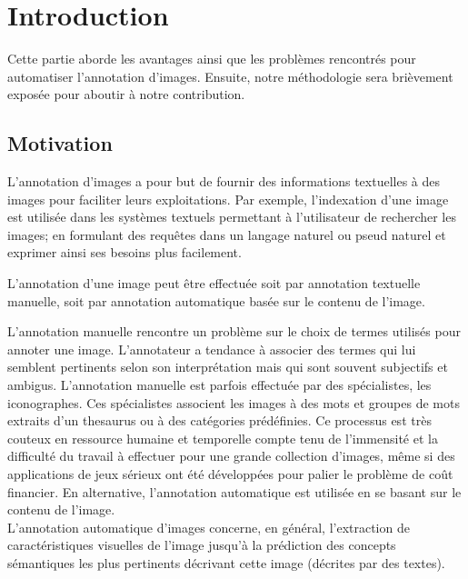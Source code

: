 \chapter{Introduction}
Cette partie aborde les avantages ainsi que les problèmes rencontrés pour automatiser l'annotation d'images. Ensuite, notre méthodologie sera brièvement exposée pour aboutir à notre contribution.

\medskip
\section{Motivation}
\medskip

L’annotation d'images a pour but de fournir des informations textuelles à des images pour faciliter leurs exploitations. Par exemple, l'indexation d'une image est utilisée dans les systèmes textuels permettant à l'utilisateur de rechercher les images; en formulant des requêtes dans un langage naturel ou pseud naturel et exprimer ainsi ses besoins plus facilement.

L'annotation d'une image peut être effectuée soit par annotation textuelle manuelle, soit par annotation automatique basée sur le contenu de l'image.


L'annotation manuelle rencontre un problème sur le choix de termes utilisés pour annoter une image. L'annotateur a tendance à associer des termes qui lui semblent pertinents selon son interprétation mais qui sont souvent subjectifs et ambigus.
L'annotation manuelle est parfois effectuée par des spécialistes, les iconographes. Ces spécialistes associent les images à des mots et groupes de mots extraits d'un thesaurus ou à des catégories prédéfinies. Ce processus est très couteux en ressource humaine et temporelle compte tenu de l'immensité et la difficulté du travail à effectuer pour une grande collection d'images, même si des applications de jeux sérieux ont été développées pour palier le problème de coût financier. En alternative, l'annotation automatique est utilisée en se basant sur le contenu de l'image.\\
\qquad L'annotation automatique d'images concerne, en général, l'extraction de caractéristiques visuelles de l'image jusqu'à la prédiction des concepts sémantiques  les plus pertinents décrivant cette image (décrites par des textes). 


